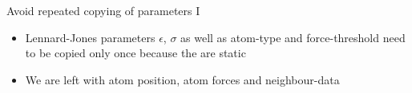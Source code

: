 \documentclass[12pt,xcolor={rgb},t]{beamer}
\begin{document}
\begin{frame}[fragile]{Avoid repeated copying of parameters I}
    
    \begin{itemize}
        \item Lennard-Jones parameters $\epsilon$, $\sigma$ as well as atom-type and force-threshold
        need to be copied only once because the are static
        \vspace*{1em}
        \begin{figure}[!H]
            \centering
        \end{figure}
        \vspace*{1em}
        \item We are left with atom position, atom forces and neighbour-data
    \end{itemize}

\end{frame}
\end{document}
